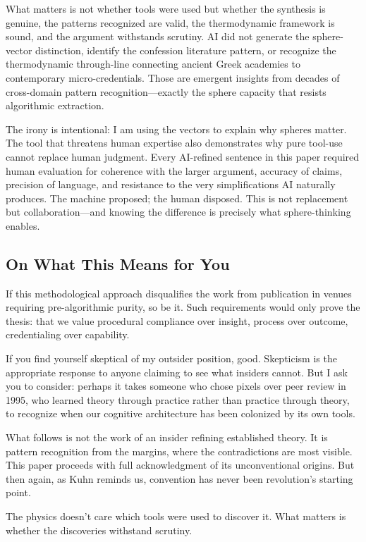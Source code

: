 What matters is not whether tools were used but whether the synthesis is genuine, the patterns recognized are valid, the thermodynamic framework is sound, and the argument withstands scrutiny. AI did not generate the sphere-vector distinction, identify the confession literature pattern, or recognize the thermodynamic through-line connecting ancient Greek academies to contemporary micro-credentials. Those are emergent insights from decades of cross-domain pattern recognition---exactly the sphere capacity that resists algorithmic extraction.

The irony is intentional: I am using the vectors to explain why spheres matter. The tool that threatens human expertise also demonstrates why pure tool-use cannot replace human judgment. Every AI-refined sentence in this paper required human evaluation for coherence with the larger argument, accuracy of claims, precision of language, and resistance to the very simplifications AI naturally produces. The machine proposed; the human disposed. This is not replacement but collaboration---and knowing the difference is precisely what sphere-thinking enables.

\subsection*{On What This Means for You}

If this methodological approach disqualifies the work from publication in venues requiring pre-algorithmic purity, so be it. Such requirements would only prove the thesis: that we value procedural compliance over insight, process over outcome, credentialing over capability.

If you find yourself skeptical of my outsider position, good. Skepticism is the appropriate response to anyone claiming to see what insiders cannot. But I ask you to consider: perhaps it takes someone who chose pixels over peer review in 1995, who learned theory through practice rather than practice through theory, to recognize when our cognitive architecture has been colonized by its own tools.

What follows is not the work of an insider refining established theory. It is pattern recognition from the margins, where the contradictions are most visible. This paper proceeds with full acknowledgment of its unconventional origins. But then again, as Kuhn reminds us, convention has never been revolution's starting point.

The physics doesn't care which tools were used to discover it. What matters is whether the discoveries withstand scrutiny.